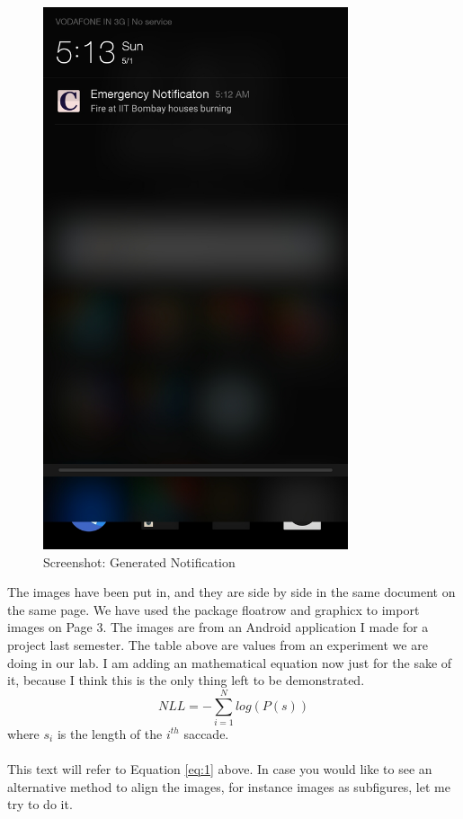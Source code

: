 \documentclass[12pt, a4paper]{article}
\begin{document}
\begin{figure}[h]
\begin{minipage}{0.48\textwidth}
	\includegraphics[width=0.8\textwidth]{and2.jpg}
	\captionsetup{width=1\linewidth}%
	\captionsetup{singlelinecheck=false}%
	\caption{Screenshot: Generated Notification}
        \label{fig:and1 }
\end{minipage}
\end{figure}
The images have been put in, and they are side by side in the same
document on the same page. We have used the package floatrow and
graphicx to import images on Page 3. The images are from an Android
application I made for a project last semester. The table above are
values from an experiment we are doing in our lab. I am adding an
mathematical equation now just for the sake of it, because I think this
is the only thing left to be demonstrated.
\begin{equation}\label{eq:1}
 NLL=-\sum_{i=1}^{N} log (P(s))
\end{equation}
where $s_i$ is the length of the $i^{th}$ saccade.
\\~\\
\hspace*{0.6cm}This text will refer to Equation \ref{eq:1} above. In case you would like to
see an alternative method to align the images, for instance images as
subfigures, let me try to do it.
\newpage
\end{document}
